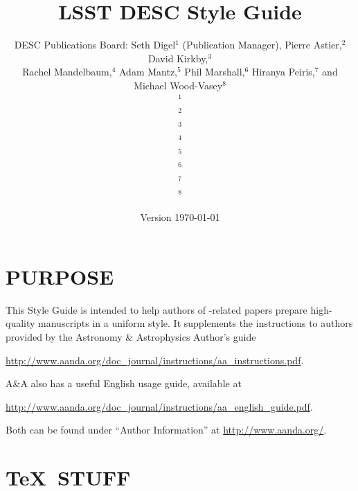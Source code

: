 \documentclass[letterpaper,11pt]{article}
\newcommand*{\version}{Version \today}
\begin{document}

\title{\vspace{5cm}LSST DESC Style Guide}
\author{DESC Publications Board: Seth Digel$^1$ (Publication Manager), Pierre Astier,$^2$ David Kirkby,$^3$\\ Rachel Mandelbaum,$^4$ Adam Mantz,$^5$ Phil Marshall,$^6$ Hiranya Peiris,$^7$ and Michael Wood-Vasey$^8$
  \medskip\\
    {\small$^1$}\\
    {\small$^2$}\\
    {\small$^3$}\\
    {\small$^4$}\\
    {\small$^5$\suphysics}\\
    {\small$^6$}\\
    {\small$^7$}\\
    {\small$^8$}
}
\date{\version}
\maketitle
\thispagestyle{fancy}

\clearpage
\fancyhead{}
\fancyhead[L]{\version}
\fancyhead[R]{\thepage}
\setcounter{page}{1}

\tableofcontents

\clearpage
\fancyhead[C]{\rightmark}
\setcounter{page}{1}

\section{PURPOSE}

This Style Guide is intended to help authors of \Planck-related papers prepare
high-quality manuscripts in a uniform style. It supplements the instructions
to authors provided by the  Astronomy \& Astrophysics Author's guide 

\url{http://www.aanda.org/doc_journal/instructions/aa_instructions.pdf}.

\noindent A\&A also has a useful English usage guide, available at 

\url{http://www.aanda.org/doc_journal/instructions/aa_english_guide.pdf}.

\noindent Both can be found under ``Author Information'' at
\url{http://www.aanda.org/}.


\section{\TeX\ STUFF}
\end{document}
